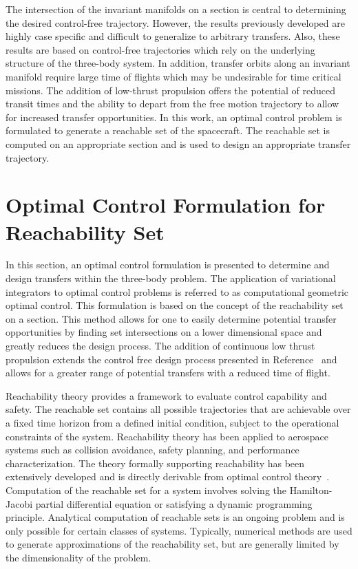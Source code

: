 \documentclass[letterpaper, paper,11pt]{AAS}		%
\begin{document}
The intersection of the invariant manifolds on a \Poincare section is central to determining the desired control-free trajectory.
However, the results previously developed are highly case specific and difficult to generalize to arbitrary transfers.
Also, these results are based on control-free trajectories which rely on the underlying structure of the three-body system.
In addition, transfer orbits along an invariant manifold require large time of flights which may be undesirable for time critical missions.
The addition of low-thrust propulsion offers the potential of reduced transit times and the ability to depart from the free motion trajectory to allow for increased transfer opportunities. 
In this work, an optimal control problem is formulated to generate a reachable set of the spacecraft.
The reachable set is computed on an appropriate \Poincare section and is used to design an appropriate transfer trajectory.
\section{Optimal Control Formulation for Reachability Set}\label{sec:optimal_control}
In this section, an optimal control formulation is presented to determine and design transfers within the three-body problem.
The application of variational integrators to optimal control problems is referred to as computational geometric optimal control.
This formulation is based on the concept of the reachability set on a \Poincare section.
This method allows for one to easily determine potential transfer opportunities by finding set intersections on a lower dimensional space and greatly reduces the design process.
The addition of continuous low thrust propulsion extends the control free design process presented in Reference~ and allows for a greater range of potential transfers with a reduced time of flight.

Reachability theory provides a framework to evaluate control capability and safety.  
The reachable set contains all possible trajectories that are achievable over a fixed time horizon from a defined initial condition, subject to the operational constraints of the system.
Reachability theory has been applied to aerospace systems such as collision avoidance, safety planning, and performance characterization.
The theory formally supporting reachability has been extensively developed and is directly derivable from optimal control theory~\cite{varaiya2000,lygeros2002,lygeros2004}.
Computation of the reachable set for a system involves solving the Hamilton-Jacobi partial differential equation or satisfying a dynamic programming principle.
Analytical computation of reachable sets is an ongoing problem and is only possible for certain classes of systems.
Typically, numerical methods are used to generate approximations of the reachability set, but are generally limited by the dimensionality of the problem.
 
\end{document}
